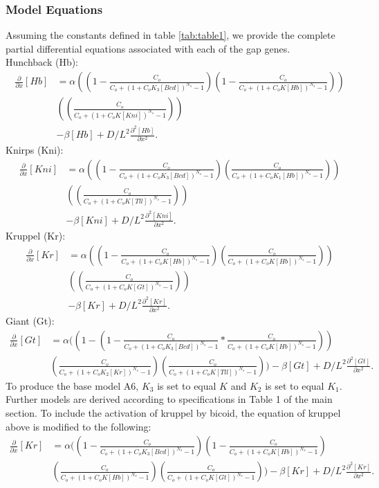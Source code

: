 \subsubsection{Model Equations}
Assuming the constants defined in table \ref{tab:table1}, we provide the complete partial differential equations associated with each of the gap genes. \\
Hunchback (Hb):
\begin{align*}
\frac{\partial }{\partial x}[Hb] &= \alpha \left ( (1 - \frac{C_o}{C_o + (1 + C_oK_3[Bcd])^{N_s} -1})(1 - \frac{C_o}{C_o + (1 + C_oK[Hb])^{N_s} -1})\right )\\ & \left ( (\frac{C_o}{C_o + (1 + C_oK[Kni])^{N_s} -1}) \right )\\
&- \beta [Hb] + D/L^2 \frac{\partial^2 [Hb]}{\partial x^2}.
\end{align*}
Knirps (Kni):
\begin{align*}
\frac{\partial }{\partial x}[Kni] &= \alpha \left ( (1 - \frac{C_o}{C_o + (1 + C_oK_3[Bcd])^{N_s} -1})(\frac{C_o}{C_o + (1 + C_oK_1[Hb])^{N_s} -1})\right)\\& \left ( (\frac{C_o}{C_o + (1 + C_oK[Tll])^{N_s} -1}) \right )\\ 
&- \beta [Kni] + D/L^2 \frac{\partial^2 [Kni]}{\partial x^2}.
\end{align*}
Kruppel (Kr):
\begin{align*}
\frac{\partial }{\partial x}[Kr] &= \alpha \left ( (1 - \frac{C_o}{C_o + (1 + C_oK[Hb])^{N_s} -1})(\frac{C_o}{C_o + (1 + C_oK[Hb])^{N_s} -1})\right)\\&\left((\frac{C_o}{C_o + (1 + C_oK[Gt])^{N_s} -1}) \right )\\ 
&- \beta [Kr] + D/L^2 \frac{\partial^2 [Kr]}{\partial x^2}.
\end{align*}
Giant (Gt):
\begin{align*}
\frac{\partial }{\partial x}[Gt] &= \alpha  \biggl( (1 - (1 - \frac{C_o}{C_o + (1 + C_oK_3[Bcd])^{N_s} -1}*\frac{C_o}{C_o + (1 + C_oK[Hb])^{N_s} -1}))  \\
 &(\frac{C_o}{C_o + (1 + C_oK_2[Kr])^{N_s} -1})(\frac{C_o}{C_o + (1 + C_oK[Tll])^{N_s} -1}) \biggr) - \beta [Gt] + D/L^2 \frac{\partial^2 [Gt]}{\partial x^2}.
\end{align*}
To produce the base model A6, $K_3$ is set to equal $K$ and $K_2$ is set to equal $K_1$. Further models are derived according to specifications in Table 1 of the main section. To include the activation of kruppel by bicoid, the equation of kruppel above is modified to the following:
\begin{align*}
\frac{\partial }{\partial x}[Kr] &= \alpha \biggl ( (1 - \frac{C_o}{C_o + (1 + C_oK_3[Bcd])^{N_s} -1})(1 - \frac{C_o}{C_o + (1 + C_oK[Hb])^{N_s} -1})\\
&(\frac{C_o}{C_o + (1 + C_oK[Hb])^{N_s} -1})(\frac{C_o}{C_o + (1 + C_oK[Gt])^{N_s} -1}) \biggr ) - \beta [Kr] + D/L^2 \frac{\partial^2 [Kr]}{\partial x^2}.
\end{align*}


